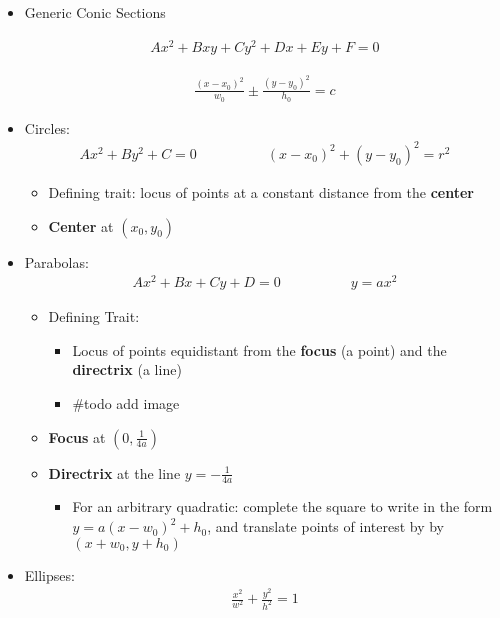 \begin{itemize}
\item
  Generic Conic Sections

  \begin{align*}A x ^ { 2 } + B x y + C y ^ { 2 } + D x + E y + F = 0\end{align*}

  \begin{align*}\frac{(x-x_0)^2}{w_0} \pm \frac{(y-y_0)^2}{h_0} = c\end{align*}
\item
  Circles:
  \begin{align*} Ax^2 + By^2 + C = 0 \hspace{5em} (x-x_0)^2 + (y-y_0)^2 = r^2\end{align*}

  \begin{itemize}
  \tightlist
  \item
    Defining trait: locus of points at a constant distance from the
    \textbf{center}
  \item
    \textbf{Center} at \((x_0, y_0)\)
  \end{itemize}
\item
  Parabolas:
  \begin{align*}Ax^2 + Bx + Cy + D = 0 \hspace{5em} y = ax^2\end{align*}

  \begin{itemize}
  \tightlist
  \item
    Defining Trait:

    \begin{itemize}
    \tightlist
    \item
      Locus of points equidistant from the \textbf{focus} (a point) and
      the \textbf{directrix} (a line)
    \item
      \#todo add image
    \end{itemize}
  \item
    \textbf{Focus} at \((0, \frac{1}{4a})\)
  \item
    \textbf{Directrix} at the line \(y = -\frac{1}{4a}\)

    \begin{itemize}
    \tightlist
    \item
      For an arbitrary quadratic: complete the square to write in the
      form \(y = a(x - w_0)^2 + h_0\), and translate points of interest
      by by \((x+w_0, y+h_0)\)
    \end{itemize}
  \end{itemize}
\item
  Ellipses:
  \begin{align*}\frac{x^2}{w^2} + \frac{y^2}{h^2} = 1\end{align*}


\end{itemize}
